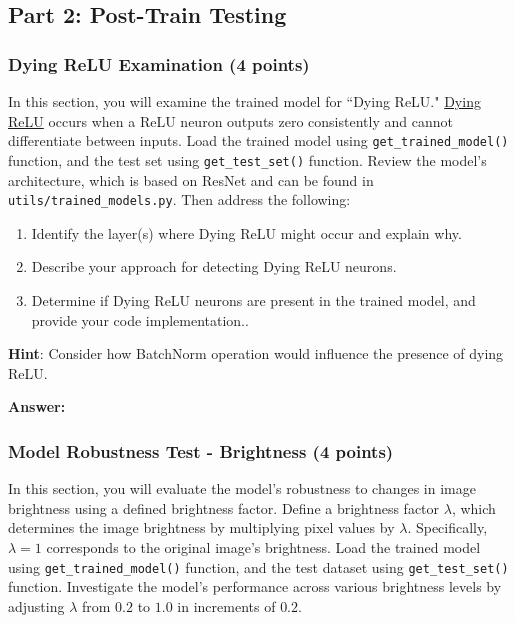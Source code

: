 \documentclass[11pt, oneside]{article}   	%
\begin{document}
\subsection*{Part 2: Post-Train Testing}

\subsubsection*{Dying ReLU Examination (4 points)}
In this section, you will examine the trained model for ``Dying ReLU." \href{https://datascience.stackexchange.com/questions/5706/what-is-the-dying-relu-problem-in-neural-networks}{Dying ReLU} occurs when a ReLU neuron outputs zero consistently and cannot differentiate between inputs. 
Load the trained model using \texttt{get\_trained\_model()} function, and the test set using \texttt{get\_test\_set()} function. Review the model's architecture, which is based on ResNet and can be found in \texttt{utils/trained\_models.py}. Then address the following:


\begin{enumerate}
    \item Identify the layer(s) where Dying ReLU might occur and explain why.
    \item Describe your approach for detecting Dying ReLU neurons. 
    \item Determine if Dying ReLU neurons are present in the trained model, and provide your code implementation..
\end{enumerate}
\textbf{Hint}: Consider how BatchNorm operation would influence the presence of dying ReLU.
    
\begin{answerbox} \textbf{Answer:} \vspace*{1cm}

\end{answerbox}

\subsubsection*{Model Robustness Test - Brightness (4 points)}
In this section, you will evaluate the model's robustness to changes in image brightness using a defined brightness factor.
Define a brightness factor $\lambda$, which determines the image brightness by multiplying pixel values by $\lambda$. Specifically, $\lambda = 1$ corresponds to the original image's brightness.
Load the trained model using \texttt{get\_trained\_model()} function, and the test dataset using \texttt{get\_test\_set()} function.  Investigate the model's performance across various brightness levels by adjusting $\lambda$ from $0.2$ to $1.0$ in increments of $0.2$. 
\end{document}
